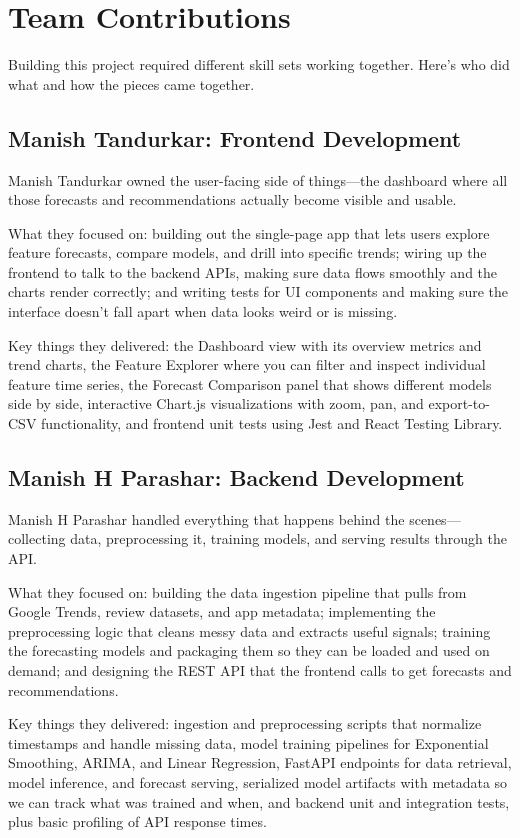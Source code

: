 \section{Team Contributions}

Building this project required different skill sets working together. Here's who did what and how the pieces came together.

\subsection{Manish Tandurkar: Frontend Development}
Manish Tandurkar owned the user-facing side of things—the dashboard where all those forecasts and recommendations actually become visible and usable.

What they focused on: building out the single-page app that lets users explore feature forecasts, compare models, and drill into specific trends; wiring up the frontend to talk to the backend APIs, making sure data flows smoothly and the charts render correctly; and writing tests for UI components and making sure the interface doesn't fall apart when data looks weird or is missing.

Key things they delivered: the Dashboard view with its overview metrics and trend charts, the Feature Explorer where you can filter and inspect individual feature time series, the Forecast Comparison panel that shows different models side by side, interactive Chart.js visualizations with zoom, pan, and export-to-CSV functionality, and frontend unit tests using Jest and React Testing Library.

\subsection{Manish H Parashar: Backend Development}
Manish H Parashar handled everything that happens behind the scenes—collecting data, preprocessing it, training models, and serving results through the API.

What they focused on: building the data ingestion pipeline that pulls from Google Trends, review datasets, and app metadata; implementing the preprocessing logic that cleans messy data and extracts useful signals; training the forecasting models and packaging them so they can be loaded and used on demand; and designing the REST API that the frontend calls to get forecasts and recommendations.

Key things they delivered: ingestion and preprocessing scripts that normalize timestamps and handle missing data, model training pipelines for Exponential Smoothing, ARIMA, and Linear Regression, FastAPI endpoints for data retrieval, model inference, and forecast serving, serialized model artifacts with metadata so we can track what was trained and when, and backend unit and integration tests, plus basic profiling of API response times.

